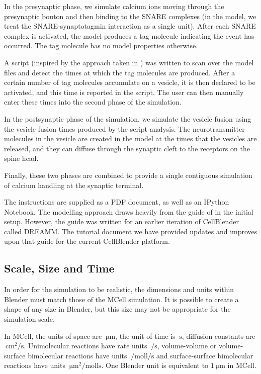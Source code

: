 \documentclass[a4paper]{article}
\begin{document}
In the presynaptic phase, we simulate calcium ions moving through the presynaptic bouton and then binding to the SNARE complexes (in the model, we treat the SNARE-synaptotagmin interaction as a single unit). After each SNARE complex is activated, the model produces a tag molecule indicating the event has occurred. The tag molecule has no model properties otherwise.

A script (inspired by the approach taken in \cite{ma2014quantitative}) was written to scan over the model files and detect the times at which the tag molecules are produced. After a certain number of tag molecules accumulate on a vesicle, it is then declared to be activated, and this time is reported in the script. The user can then manually enter these times into the second phase of the simulation.

In the postsynaptic phase of the simulation, we simulate the vesicle fusion using the vesicle fusion times produced by the script analysis. The neurotransmitter molecules in the vesicle are created in the model at the times that the vesicles are released, and they can diffuse through the synaptic cleft to the receptors on the spine head.

Finally, these two phases are combined to provide a single contiguous simulation of calcium handling at the synaptic terminal.

The instructions are supplied as a PDF document, as well as an IPython Notebook. The modelling approach draws heavily from the guide of \cite{Czech:MethodsMolBiol:2009} in the initial setup. However, the guide was written for an earlier iteration of CellBlender called DREAMM. The tutorial document we have provided updates and improves upon that guide for the current CellBlender platform.

\subsection{Scale, Size and Time}
In order for the simulation to be realistic, the dimensions and units within Blender must match those of the MCell simulation. It is possible to create a shape of any size in Blender, but this size may not be appropriate for the simulation scale.

In MCell, the units of space are $\SI{}{\micro\metre}$, the unit of time is $\SI{}{\second}$, diffusion constants are $\SI{}{\centi\metre\squared\per\second}$. Unimolecular reactions have rate units $\SI{}{\per\second}$, volume-volume or volume-surface bimolecular reactions have units $\SI{}{\per\mole\litre\per\second}$ and surface-surface bimolecular reactions have units $\SI{}{\micro\metre\squared\per\mole\litre\second}$. One Blender unit is equivalent to $\SI{1}{\micro\metre}$ in MCell. 
\end{document}
